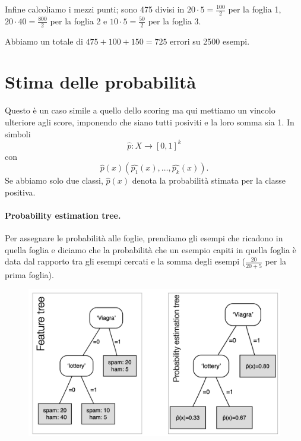 Infine calcoliamo i mezzi punti; sono 475 divisi in $20\cdot 5=\frac{100}{2}$ per la foglia 1, $20\cdot 40=\frac{800}{2}$ per la foglia 2 e $10\cdot 5=\frac{50}{2}$ per la foglia 3.

Abbiamo un totale di $475+100+150=725$ errori su 2500 esempi.

\newpage

\section{Stima delle probabilità}
Questo è un caso simile a quello dello scoring ma qui mettiamo un vincolo ulteriore agli score, imponendo che siano tutti posiviti e la loro somma sia 1. In simboli
\begin{equation}
    \hat{p}:X\rightarrow [0,1]^k
\end{equation}
con
\begin{equation}
    \hat{p}(x)(\hat{p_1}(x),\dots,\hat{p_k}(x)).
\end{equation}
Se abbiamo solo due classi, $\hat{p}(x)$ denota la probabilità stimata per la classe positiva.

\paragraph{Probability estimation tree.} Per assegnare le probabilità alle foglie, prendiamo gli esempi che ricadono in quella foglia e diciamo che la probabilità che un esempio capiti in quella foglia è data dal rapporto tra gli esempi cercati e la somma degli esempi ($\frac{20}{20+5}$ per la prima foglia).
\begin{figure}[!h]
    \centering
    \includegraphics[scale=0.6]{images/probTree.png}
    \label{fig:enter-label}
\end{figure}

